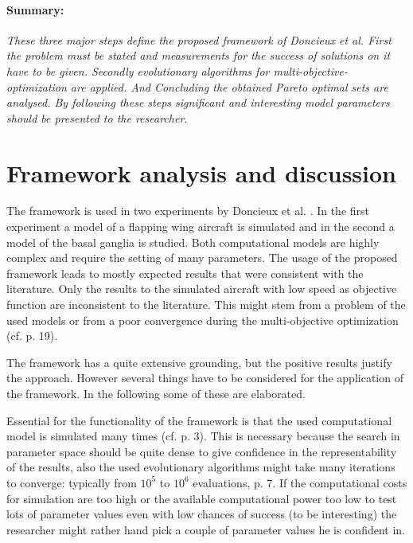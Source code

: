 \documentclass[12pt,twoside]{article}
\theoremstyle{plain}
\theoremstyle{definition}
\theoremstyle{remark}
\begin{document}
\paragraph{Summary:}
\textit{
	These three major steps define the proposed framework of Doncieux et al.
	First the problem must be stated and measurements for the success of solutions on it have to be given. Secondly evolutionary algorithms for multi-objective-optimization are applied. And Concluding the obtained Pareto optimal sets are analysed.
	By following these steps significant and interesting model parameters should be presented to the researcher.
}

\section{Framework analysis and discussion}
\label{sec:analysis}

The framework is used in two experiments by Doncieux et al. \cite{doncieux2015multi}.
In the first experiment a model of a flapping wing aircraft is simulated and in the second a model of the basal ganglia is studied. Both computational models are highly complex and require the setting of many parameters. The usage of the proposed framework leads to mostly expected results that were consistent with the literature. Only the results to the simulated aircraft with low speed as objective function are inconsistent to the literature. This might stem from a problem of the used models or from a poor convergence during the multi-objective optimization (cf. \cite{doncieux2015multi} p. 19).\medskip

The framework has a quite extensive grounding, but the positive results justify the approach. However several things have to be considered for the application of the framework. In the following some of these are elaborated.\medskip

Essential for the functionality of the framework is that the used computational model is simulated many times (cf. \cite{doncieux2015multi} p. 3).
This is necessary because the search in parameter space should be quite dense to give confidence in the representability of the results, also the used evolutionary algorithms might take many iterations to converge: \glqq typically from $10^5$ to $10^6$ evaluations\grqq{}, \cite{doncieux2015multi} p. 7.
If the computational costs for simulation are too high or the available computational power too low to test lots of parameter values even with low chances of success (to be interesting) the researcher might rather hand pick a couple of parameter values he is confident in.\medskip
\end{document}
